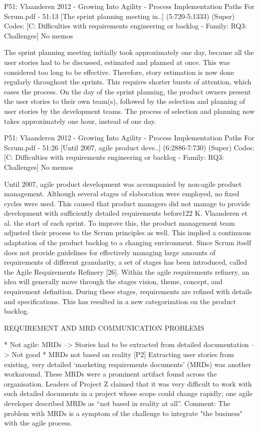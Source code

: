 \documentclass[preprint,authoryear,12pt]{elsarticle}
\begin{document}
P51: Vlaanderen 2012 - Growing Into Agility - Process Implementation Paths For Scrum.pdf - 51:13 [The sprint planning meeting in..]  (5:720-5:1333)   (Super)
Codes:	[C: Difficulties with requirements engineering or backlog - Family: RQ3: Challenges] 
No memos

The sprint planning meeting initially took approximately one day, because
all the user stories had to be discussed, estimated and planned at once. This
was considered too long to be eﬀective. Therefore, story estimation is now done
regularly throughout the sprints. This requires shorter bursts of attention, which
eases the process. On the day of the sprint planning, the product owners present
the user stories to their own team(s), followed by the selection and planning of
user stories by the development teams. The process of selection and planning
now takes approximately one hour, instead of one day.


P51: Vlaanderen 2012 - Growing Into Agility - Process Implementation Paths For Scrum.pdf - 51:26 [Until 2007, agile product deve..]  (6:2886-7:730)   (Super)
Codes:	[C: Difficulties with requirements engineering or backlog - Family: RQ3: Challenges] 
No memos

Until 2007, agile product development was accompanied by
non-agile product management. Although several stages of elaboration were employed, no ﬁxed cycles were used. This caused that product managers did not
manage to provide development with suﬃciently detailed requirements before122 K. Vlaanderen et al.
the start of each sprint. To improve this, the product management team adjusted their process to the Scrum principles as well. This implied a continuous
adaptation of the product backlog to a changing environment. Since Scrum itself does not provide guidelines for eﬀectively managing large amounts of requirements of diﬀerent granularity, a set of stages has been introduced, called
the Agile Requirements Reﬁnery [26]. Within the agile requirements reﬁnery, an
idea will generally move through the stages vision, theme, concept, and requirement deﬁnition. During these stages, requirements are reﬁned with details and
speciﬁcations. This has resulted in a new categorization on the product backlog.








REQUIREMENT AND MRD COMMUNICATION PROBLEMS

* Not agile: MRDs --> Stories had to be extracted from detailed documentation --> Not good
* MRDs not based on reality
[P2]
Extracting user stories from existing, very detailed ‘marketing requirements
documents’ (MRDs) was another workaround. These MRDs were a prominent artifact
found across the organisation. Leaders of Project Z claimed that it was very
difficult to work with such detailed documents in a project whose scope could
change rapidly; one agile developer described MRDs as “not based in reality at
all”.
Comment:
The problem with MRDs is a symptom of the challenge to integrate "the business" with the agile process.
\end{document}
